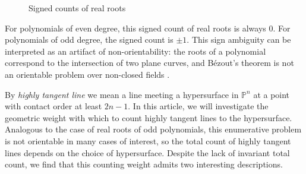 \documentclass[12pt]{amsart}
\numberwithin{equation}{section}
\theoremstyle{plain}
\theoremstyle{definition}
\newcommand{\mb}[1]{\mathbb{#1}}
\begin{document}
\begin{figure}[h]
\quad
{}
\quad
{}
\quad
{}
    \caption{Signed counts of real roots}\label{fig:polynomials}
\end{figure}

For polynomials of even degree, this signed count of real roots is always 0. For polynomials of odd degree, the signed count is $\pm 1$. This sign ambiguity can be interpreted as an artifact of non-orientability: the roots of a polynomial correspond to the intersection of two plane curves, and B\'ezout's theorem is not an orientable problem over non-closed fields \cite{MR4211099}.

By \emph{highly tangent line} we mean a line meeting a hypersurface in $\mb{P}^n$ at a point with contact order at least $2n-1$. In this article, we will investigate the geometric weight with which to count highly tangent lines to the hypersurface. Analogous to the case of real roots of odd polynomials, this enumerative problem is not orientable in many cases of interest, so the total count of highly tangent lines depends on the choice of hypersurface. Despite the lack of invariant total count, we find that this counting weight admits two interesting descriptions.
\end{document}
